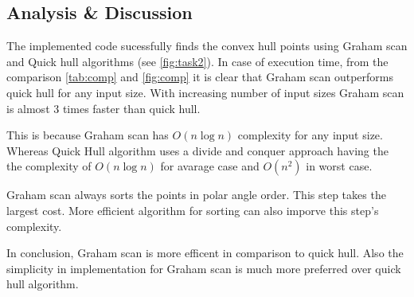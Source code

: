 \subsection{Analysis \& Discussion}
The implemented code sucessfully finds the convex hull points using
Graham scan and Quick hull algorithms (see \cref{fig:task2}). In case of
execution time, from the comparison \cref{tab:comp} and \cref{fig:comp}
it is clear that Graham scan
outperforms quick hull for any input size. With increasing number of input sizes
Graham scan is almost 3 times faster than quick hull.

This is because Graham scan has $O(n \log n)$ complexity for any input size. 
Whereas Quick Hull algorithm uses a divide and conquer approach having the 
the complexity of $O(n \log n)$ for avarage case and $O(n^2)$ in worst case.

Graham scan always sorts the points in polar angle order. This step takes the 
largest cost. More efficient algorithm for sorting can also imporve this step's 
complexity. 

In conclusion, Graham scan is more efficent in comparison to quick hull. Also
the simplicity in implementation for Graham scan is much more
preferred over quick
hull algorithm.

